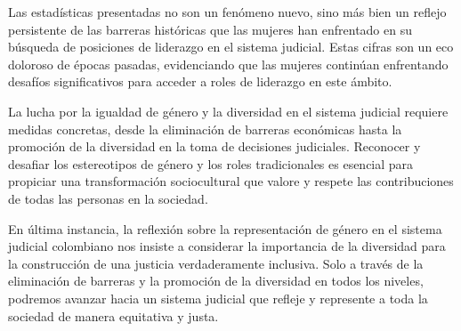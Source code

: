 \documentclass[letterpaper, 12pt]{article}
\begin{document}
Las estadísticas presentadas no son un fenómeno nuevo, sino
más bien un reflejo persistente de las barreras históricas
que las mujeres han enfrentado en su búsqueda de posiciones
de liderazgo en el sistema judicial. Estas cifras son un
eco doloroso de épocas pasadas, evidenciando que las
mujeres continúan enfrentando desafíos significativos para
acceder a roles de liderazgo en este ámbito.

La lucha por la igualdad de género y la diversidad en el
sistema judicial requiere medidas concretas, desde la
eliminación de barreras económicas hasta la promoción de la
diversidad en la toma de decisiones judiciales. Reconocer y
desafiar los estereotipos de género y los roles
tradicionales es esencial para propiciar una transformación
sociocultural que valore y respete las contribuciones de
todas las personas en la sociedad.

En última instancia, la reflexión sobre la representación
de género en el sistema judicial colombiano nos insiste a
considerar la importancia de la diversidad para la
construcción de una justicia verdaderamente inclusiva. Solo
a través de la eliminación de barreras y la promoción de la
diversidad en todos los niveles, podremos avanzar hacia un
sistema judicial que refleje y represente a toda la
sociedad de manera equitativa y justa.

\nocite{Colprensa_2016}
\nocite{FiscalíaGeneralNación_2022}
\nocite{Vacía_Vacía_2023}
\nocite{agenda}

\printbibliography
\end{document}
